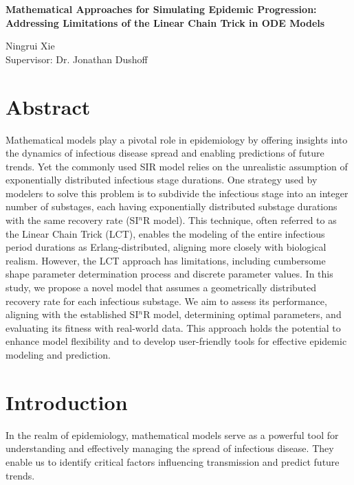 \documentclass[12pt]{article}
\begin{document}
\begin{spacing}{1.0}
\begin{center}
    \Large
    \textbf{Mathematical Approaches for Simulating Epidemic Progression: Addressing Limitations of the Linear Chain Trick in ODE Models}
    
    \large
    \vspace{0.4cm}
    Ningrui Xie \\ Supervisor: Dr. Jonathan Dushoff
\end{center}
\end{spacing}

\section*{Abstract}

Mathematical models play a pivotal role in epidemiology by offering insights into the dynamics of infectious disease spread and enabling predictions of future trends. Yet the commonly used SIR model relies on the unrealistic assumption of exponentially distributed infectious stage durations. One strategy used by modelers to solve this problem is to subdivide the infectious stage into an integer number of substages, each having exponentially distributed substage durations with the same recovery rate (SI$^n$R model). This technique, often referred to as the Linear Chain Trick (LCT), enables the modeling of the entire infectious period durations as Erlang-distributed, aligning more closely with biological realism. However, the LCT approach has limitations, including cumbersome shape parameter determination process and discrete parameter values. In this study, we propose a novel model that assumes a geometrically distributed recovery rate for each infectious substage. We aim to assess its performance, aligning with the established SI$^n$R model, determining optimal parameters, and evaluating its fitness with real-world data. This approach holds the potential to enhance model flexibility and to develop user-friendly tools for effective epidemic modeling and prediction.

\section*{Introduction}
In the realm of epidemiology, mathematical models serve as a powerful tool for understanding and effectively managing the spread of infectious disease. They enable us to identify critical factors influencing transmission and predict future trends.
\end{document}
